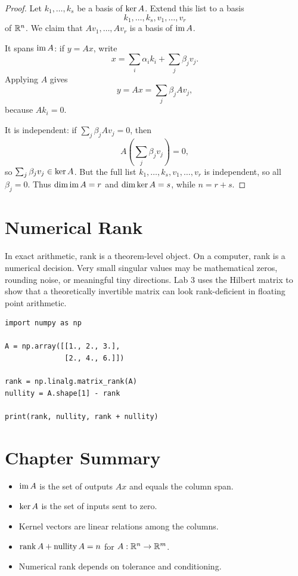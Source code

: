 \begin{proof}
Let $k_1,\ldots,k_s$ be a basis of $\operatorname{ker} A$. Extend this list to a basis
\[
  k_1,\ldots,k_s,v_1,\ldots,v_r
\]
of $\mathbb{R}^n$. We claim that $Av_1,\ldots,Av_r$ is a basis of $\operatorname{im} A$.

It spans $\operatorname{im} A$: if $y=Ax$, write
\[
  x=\sum_i \alpha_i k_i+\sum_j \beta_j v_j.
\]
Applying $A$ gives
\[
  y=Ax=\sum_j \beta_j Av_j,
\]
because $Ak_i=0$.

It is independent: if $\sum_j \beta_j Av_j=0$, then
\[
  A\left(\sum_j \beta_j v_j\right)=0,
\]
so $\sum_j\beta_jv_j\in\operatorname{ker} A$. But the full list
$k_1,\ldots,k_s,v_1,\ldots,v_r$ is independent, so all $\beta_j=0$.
Thus $\dim\operatorname{im} A=r$ and $\dim\operatorname{ker} A=s$, while $n=r+s$.
\end{proof}

\section{Numerical Rank}

In exact arithmetic, rank is a theorem-level object. On a computer, rank is a
numerical decision. Very small singular values may be mathematical zeros,
rounding noise, or meaningful tiny directions. Lab 3 uses the Hilbert matrix
to show that a theoretically invertible matrix can look rank-deficient in
floating point arithmetic.

\begin{lstlisting}
import numpy as np

A = np.array([[1., 2., 3.],
              [2., 4., 6.]])

rank = np.linalg.matrix_rank(A)
nullity = A.shape[1] - rank

print(rank, nullity, rank + nullity)
\end{lstlisting}

\section*{Chapter Summary}

\begin{itemize}
  \item $\operatorname{im} A$ is the set of outputs $Ax$ and equals the column span.
  \item $\operatorname{ker} A$ is the set of inputs sent to zero.
  \item Kernel vectors are linear relations among the columns.
  \item $\operatorname{rank} A+\operatorname{nullity} A=n$ for $A:\mathbb{R}^n\to\mathbb{R}^m$.
  \item Numerical rank depends on tolerance and conditioning.
\end{itemize}

